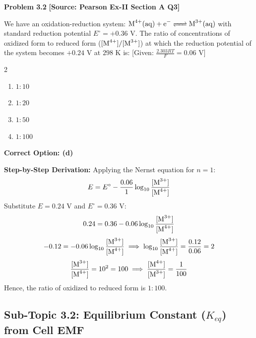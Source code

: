 \begin{problembox}
\textbf{Problem 3.2} \hfill \textbf{[Source: Pearson Ex-II Section A Q3]}

We have an oxidation-reduction system: $\ce{M^4+(aq) + e^- <=> M^3+(aq)}$ with standard reduction potential $E^\circ = +0.36\text{ V}$. The ratio of concentrations of oxidized form to reduced form ($[\ce{M^4+}] / [\ce{M^3+}]$) at which the reduction potential of the system becomes $+0.24\text{ V}$ at $298\text{ K}$ is: [Given: $\frac{2.303 RT}{F} = 0.06\text{ V}$]
\begin{multicols}{2}
\begin{enumerate}[label=(\alph*)]
    \item $1 : 10$
    \item $1 : 20$
    \item $1 : 50$
    \item $1 : 100$
\end{enumerate}
\end{multicols}
\end{problembox}
\begin{solution}
\textbf{Correct Option: (d)}

\textbf{Step-by-Step Derivation:}
Applying the Nernst equation for $n = 1$:
\begin{equation*}
    E = E^\circ - \frac{0.06}{1} \log_{10} \frac{[\ce{M^3+}]}{[\ce{M^4+}]}
\end{equation*}
Substitute $E = 0.24\text{ V}$ and $E^\circ = 0.36\text{ V}$:
\begin{equation*}
    0.24 = 0.36 - 0.06 \log_{10} \frac{[\ce{M^3+}]}{[\ce{M^4+}]}
\end{equation*}
\begin{equation*}
    -0.12 = -0.06 \log_{10} \frac{[\ce{M^3+}]}{[\ce{M^4+}]} \implies \log_{10} \frac{[\ce{M^3+}]}{[\ce{M^4+}]} = \frac{0.12}{0.06} = 2
\end{equation*}
\begin{equation*}
    \frac{[\ce{M^3+}]}{[\ce{M^4+}]} = 10^2 = 100 \implies \frac{[\ce{M^4+}]}{[\ce{M^3+}]} = \frac{1}{100}
\end{equation*}
Hence, the ratio of oxidized to reduced form is $1 : 100$.
\end{solution}

\subsection{Sub-Topic 3.2: Equilibrium Constant ($K_{eq}$) from Cell EMF}

